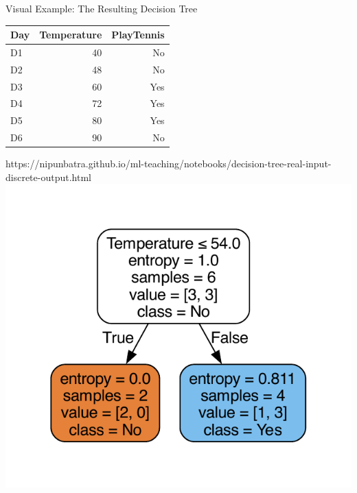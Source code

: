 \documentclass[usenames,dvipsnames]{beamer}
\begin{document}
    \begin{frame}{Visual Example: The Resulting Decision Tree}
        \begin{table}[]
            \begin{tabular}{@{}lrr@{}}
                \toprule
                \textbf{Day} & \textbf{Temperature} & \textbf{PlayTennis} \\ \midrule
                D1           & 40                   & No                  \\
                D2           & 48                   & No                  \\
                D3           & 60                   & Yes                 \\
                D4           & 72                   & Yes                 \\
                D5           & 80                   & Yes                 \\
                D6           & 90                   & No                  \\ \bottomrule
            \end{tabular}
        \end{table}
        \begin{notebookbox}{https://nipunbatra.github.io/ml-teaching/notebooks/decision-tree-real-input-discrete-output.html}
            \includegraphics[scale=0.3]{../assets/decision-trees/figures/real-ip-1.pdf}
        \end{notebookbox}
    \end{frame}
\end{document}
